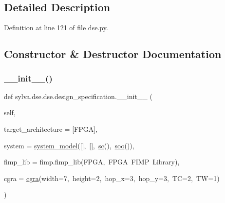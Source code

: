 \subsection{Detailed Description}


Definition at line 121 of file dse.\+py.



\subsection{Constructor \& Destructor Documentation}
\mbox{\label{classsylva_1_1dse_1_1dse_1_1design__specification_a663ec78bf7e1432ce1bcdb32272e5c78}} 
\subsubsection{\texorpdfstring{\+\_\+\+\_\+init\+\_\+\+\_\+()}{\_\_init\_\_()}}
{\footnotesize\ttfamily def sylva.\+dse.\+dse.\+design\+\_\+specification.\+\_\+\+\_\+init\+\_\+\+\_\+ (\begin{DoxyParamCaption}\item[{}]{self,  }\item[{}]{target\+\_\+architecture = {\ttfamily \mbox{[}\textquotesingle{}FPGA\textquotesingle{}\mbox{]}},  }\item[{}]{system = {\ttfamily \hyperlink{classsylva_1_1dse_1_1dse_1_1system__model}{system\+\_\+model}(\mbox{[}\mbox{]},~\mbox{[}\mbox{]},~\hyperlink{namespacesylva_1_1dse_1_1dse_ac2d9fdcc3f7fd0bad1900fa0a813dff4}{sc}(),~\hyperlink{namespacesylva_1_1dse_1_1dse_ab54fbae03bc2c432fecd4486e623af71}{soo}())},  }\item[{}]{fimp\+\_\+lib = {\ttfamily fimp.fimp\+\_\+lib(\textquotesingle{}FPGA\textquotesingle{},~\textquotesingle{}FPGA~FIMP~Library\textquotesingle{})},  }\item[{}]{cgra = {\ttfamily \hyperlink{classsylva_1_1dse_1_1dse_1_1design__specification_af2a020bde2455890f0bafc6519b65712}{cgra}(width=7,~height=2,~hop\+\_\+x=3,~hop\+\_\+y=3,~TC=2,~TW=1)} }\end{DoxyParamCaption})}



